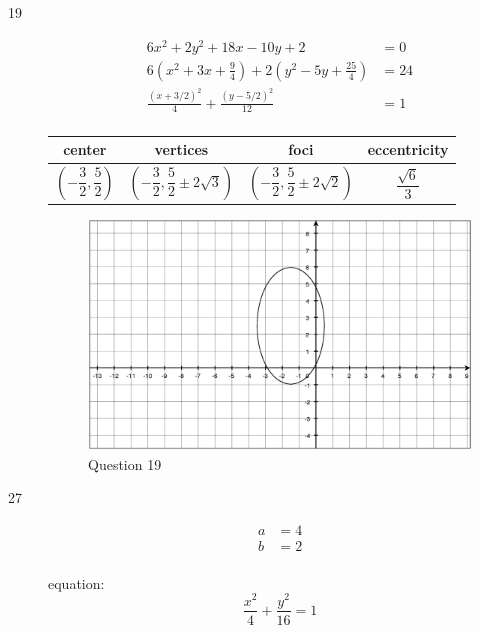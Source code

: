 \documentclass[fleqn,addpoints]{exam}
\begin{document}
\begin{description}
\item[19]
\begin{align*}
  6x^2 + 2y^2 + 18x - 10y + 2 &= 0 \\
  6(x^2 + 3x + \frac{9}{4}) + 2(y^2 - 5y + \frac{25}{4}) &= 24 \\
  \frac{(x+3/2)^2}{4} + \frac{(y-5/2)^2}{12} &= 1 \\
\end{align*}

\begin{tabular}{cccc}
\toprule
center & vertices & foci & eccentricity \\
\midrule
  $(-\dfrac{3}{2}, \dfrac{5}{2})$ & $(-\dfrac{3}{2}, \dfrac{5}{2} \pm 2 \sqrt{3})$ & $(-\dfrac{3}{2}, \dfrac{5}{2} \pm 2\sqrt{2})$ & $\dfrac{\sqrt{6}}{3}$ \\
\bottomrule
\end{tabular}

\begin{figure}[H]
  \centering
  \includegraphics[scale=.3]{p792_19.eps}
  \caption*{Question 19}
\end{figure}

\item[27]
\begin{align*}
  a &= 4 \\
  b &= 2 \\
\end{align*}

equation:
\[
  \frac{x^2}{4} + \frac{y^2}{16} = 1
\]



\end{description}
\end{document}
